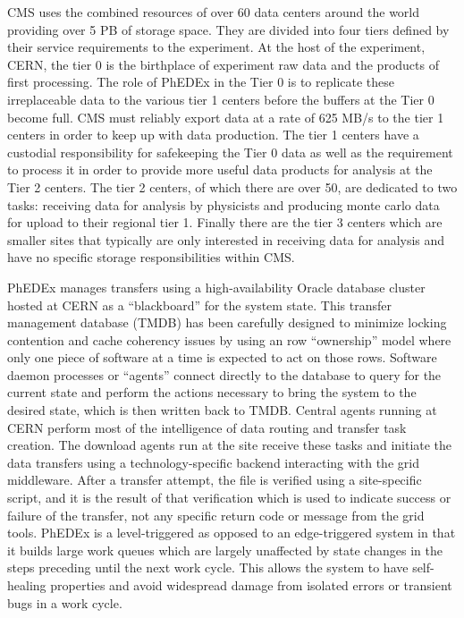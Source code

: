 \documentclass{PoS}
\begin{document}
CMS uses the combined resources of over 60 data centers around the
world providing over 5 PB of storage space.  They are divided into
four tiers defined by their service requirements to the experiment.
At the host of the experiment, CERN, the tier 0 is the birthplace of
experiment raw data and the products of first processing.  The role of
PhEDEx in the Tier 0 is to replicate these irreplaceable data to the
various tier 1 centers before the buffers at the Tier 0 become full.
CMS must reliably export data at a rate of 625 MB/s to the tier 1
centers in order to keep up with data production.  The tier 1 centers
have a custodial responsibility for safekeeping the Tier 0 data as
well as the requirement to process it in order to provide more useful
data products for analysis at the Tier 2 centers.  The tier 2 centers,
of which there are over 50, are dedicated to two tasks: receiving data
for analysis by physicists and producing monte carlo data for upload
to their regional tier 1.  Finally there are the tier 3 centers which
are smaller sites that typically are only interested in receiving data
for analysis and have no specific storage responsibilities within CMS.

PhEDEx manages transfers using a high-availability Oracle database
cluster hosted at CERN as a ``blackboard'' for the system state.  This
transfer management database (TMDB) has been carefully designed to
minimize locking contention and cache coherency issues by using an row
``ownership'' model where only one piece of software at a time is
expected to act on those rows.  Software daemon processes or
``agents'' connect directly to the database to query for the current
state and perform the actions necessary to bring the system to the
desired state, which is then written back to TMDB.  Central agents
running at CERN perform most of the intelligence of data routing and
transfer task creation.  The download agents run at the site receive
these tasks and initiate the data transfers using a
technology-specific backend interacting with the grid middleware.
After a transfer attempt, the file is verified using a site-specific
script, and it is the result of that verification which is used to
indicate success or failure of the transfer, not any specific return
code or message from the grid tools.  PhEDEx is a level-triggered as
opposed to an edge-triggered system in that it builds large work
queues which are largely unaffected by state changes in the steps
preceding until the next work cycle.  This allows the system to have
self-healing properties and avoid widespread damage from isolated
errors or transient bugs in a work cycle.
\end{document}
